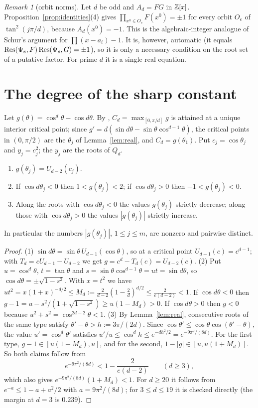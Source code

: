 \documentclass[11pt]{amsart}
\theoremstyle{definition}\newtheorem{definition}[theorem]{Definition}\newtheorem{example}[theorem]{Example}
\theoremstyle{remark}\newtheorem{remark}[theorem]{Remark}
\begin{document}
\begin{remark}[orbit norms]
Let $d$ be odd and $A_d=FG$ in $\mathbb Z[x]$. Proposition~\ref{prop:identities}(4) gives $\prod_{x^0\in O_e}F(x^0)=\pm1$ for every orbit $O_e$ of
$\tan^2(j\pi/d)$, because $A_d(x^0)=-1$. This is the algebraic-integer analogue of Schur's argument for $\prod(x-a_i)-1$. It is, however,
automatic (it equals $\operatorname{Res}(\Psi_e,F)\operatorname{Res}(\Psi_e,G)=\pm1$), so it is only a necessary condition on the root set of a putative factor. For prime
$d$ it is a single real equation.
\end{remark}

\section{The degree of the sharp constant}\label{sec:degree}
Let $g(\theta)=\cos^d\theta-\cos d\theta$. By \cite[Thm~2.4]{I}, $C_d=\max_{[0,\pi/d]}g$ is attained at a unique interior critical point; since
$g'=d(\sin d\theta-\sin\theta\cos^{d-1}\theta)$, the critical points in $(0,\pi/2)$ are the $\theta_j$ of Lemma~\ref{lem:real}, and $C_d=g(\theta_1)$.
Put $c_j=\cos\theta_j$ and $y_j=c_j^2$; the $y_j$ are the roots of $Q_d$.

\begin{lemma}\label{lem:gvalues}
\begin{enumerate}
\item $g(\theta_j)=U_{d-2}(c_j)$.
\item If $\cos d\theta_j<0$ then $1<g(\theta_j)<2$; if $\cos d\theta_j>0$ then $-1<g(\theta_j)<0$.
\item Along the roots with $\cos d\theta_j<0$ the values $g(\theta_j)$ strictly decrease; along those with $\cos d\theta_j>0$ the values
$|g(\theta_j)|$ strictly increase.
\end{enumerate}
In particular the numbers $|g(\theta_j)|$, $1\le j\le m$, are nonzero and pairwise distinct.
\end{lemma}
\begin{proof}
(1) $\sin d\theta=\sin\theta\,U_{d-1}(\cos\theta)$, so at a critical point $U_{d-1}(c)=c^{d-1}$; with $T_d=cU_{d-1}-U_{d-2}$ we get
$g=c^d-T_d(c)=U_{d-2}(c)$.
(2) Put $u=\cos^d\theta$, $t=\tan\theta$ and $s=\sin\theta\cos^{d-1}\theta=ut=\sin d\theta$, so $\cos d\theta=\pm\sqrt{1-s^2}$. With $x=t^2$ we have
$ut^2=x(1+x)^{-d/2}\le M_d:=\frac2{d-2}(1-\frac2d)^{d/2}\le\frac2{e(d-2)}<1$. If $\cos d\theta<0$ then $g-1=u-s^2/(1+\sqrt{1-s^2})\ge u(1-M_d)>0$.
If $\cos d\theta>0$ then $g<0$ because $u^2+s^2=\cos^{2d-2}\theta<1$.
(3) By Lemma~\ref{lem:real}, consecutive roots of the same type satisfy $\theta'-\theta>h:=3\pi/(2d)$. Since
$\cos\theta'\le\cos\theta\cos(\theta'-\theta)$, the value $u'=\cos^d\theta'$ satisfies $u'/u\le\cos^dh\le e^{-dh^2/2}=e^{-9\pi^2/(8d)}$. For the first
type, $g-1\in[u(1-M_d),u]$, and for the second, $1-|g|\in[u,u(1+M_d)]$. So both claims follow from
\[e^{-9\pi^2/(8d)}<1-\frac2{e(d-2)}\qquad(d\ge3),\]
which also gives $e^{-9\pi^2/(8d)}(1+M_d)<1$. For $d\ge20$ it follows from $e^{-a}\le1-a+a^2/2$ with $a=9\pi^2/(8d)$; for $3\le d\le19$ it is checked
directly (the margin at $d=3$ is $0.239$).
\end{proof}
\end{document}
